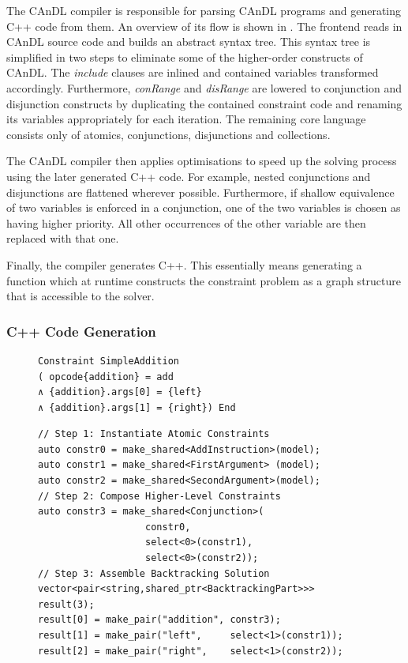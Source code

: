     The CAnDL compiler is responsible for parsing CAnDL programs and
    generating C++ code from them.
    An overview of its  flow is shown in .
    The frontend reads in  CAnDL source code and builds an abstract syntax tree.
    This syntax tree is simplified in two steps to eliminate some of the
    higher-order constructs of CAnDL.
    The {\it include} clauses are inlined and contained variables
    transformed accordingly.
    Furthermore, {\it conRange} and {\it disRange} are lowered to
    conjunction and disjunction constructs by duplicating the contained
    constraint code and renaming its variables appropriately for each iteration.
    The remaining core language consists only of atomics, conjunctions,
    disjunctions and collections.

    The CAnDL compiler then applies optimisations to speed up the solving
    process using the later generated C++ code.
    For example, nested conjunctions and disjunctions are flattened wherever
    possible.
    Furthermore, if shallow equivalence of two variables is enforced in a
    conjunction, one of the two variables is chosen as having higher priority.
    All other occurrences of the other variable are then replaced with that
    one.

    Finally, the compiler generates C++.
    This essentially means generating a function which at runtime constructs
    the constraint problem as a graph structure that is accessible to the
    solver.

\subsubsection{C++ Code Generation}

\begin{figure}[t]
\centering
\vspace{3.6mm}
\begin{lstlisting}[language=CAnDL]
Constraint SimpleAddition
( opcode{addition} = add
∧ {addition}.args[0] = {left}
∧ {addition}.args[1] = {right}) End
\end{lstlisting}
\begin{lstlisting}[language=MyCpp,label={fig:codegen},caption=
   {C++ code generation: The code is generated to first instantiate atomic
    constraints, then compose higher-level constructs, and finally assemble a
    backtracking solution for solving.}]
// Step 1: Instantiate Atomic Constraints
auto constr0 = make_shared<AddInstruction>(model);
auto constr1 = make_shared<FirstArgument> (model);
auto constr2 = make_shared<SecondArgument>(model);
// Step 2: Compose Higher-Level Constraints
auto constr3 = make_shared<Conjunction>(
                   constr0,
                   select<0>(constr1),
                   select<0>(constr2));
// Step 3: Assemble Backtracking Solution
vector<pair<string,shared_ptr<BacktrackingPart>>> result(3);
result[0] = make_pair("addition", constr3);
result[1] = make_pair("left",     select<1>(constr1));
result[2] = make_pair("right",    select<1>(constr2));
\end{lstlisting}
\end{figure}

